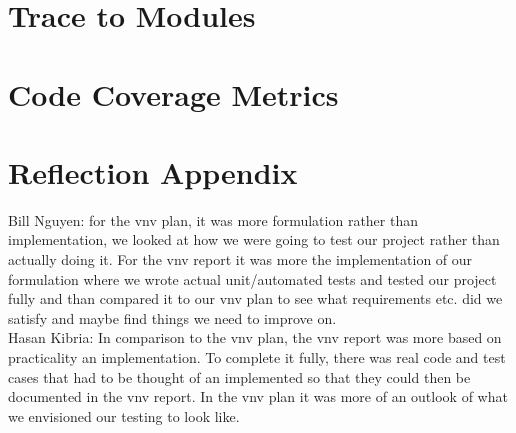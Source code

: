 \documentclass[12pt, titlepage]{article}
\begin{document}
\section{Trace to Modules}		

\section{Code Coverage Metrics}

\section{Reflection Appendix}

Bill Nguyen: for the vnv plan, it was more formulation rather than implementation, we looked at how we were going to test our project rather than actually doing it. For the vnv report it 
was more the implementation of our formulation where we wrote actual unit/automated tests and tested our project fully and than compared it to our vnv plan to see what requirements etc. did we satisfy and maybe find things we need to improve on.\\

Hasan Kibria: In comparison to the vnv plan, the vnv report was more based on practicality an implementation. To complete it fully, there was real code and test cases that had to be thought of an implemented so that they could then be documented in the vnv report. In the vnv plan it was more of an outlook of what we envisioned our testing to look like.\\





\end{document}

